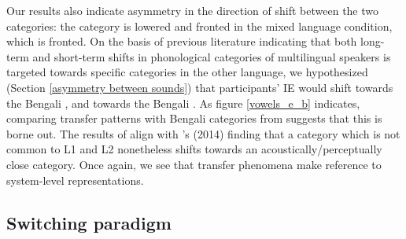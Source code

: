 \documentclass[12 pt]{article}
\newcommand{\nt}[1]{\textipa{[#1]}} %
\begin{document}
Our results also indicate asymmetry in the direction of shift between the two categories: the category \nt{2} is lowered and fronted in the mixed language condition, which \nt{\ae} is fronted. On the basis of previous literature indicating that both long-term and short-term shifts in phonological categories of multilingual speakers is targeted towards specific categories in the other language, we hypothesized (Section \ref{asymmetry between sounds}) that participants' IE \nt{\ae} would shift towards the Bengali \nt{\ae}, and \nt{2} towards the Bengali \nt{a:}. As figure \ref{vowels_e_b} indicates, comparing transfer patterns with Bengali categories from \cite{shruticorpus} suggests that this is borne out. The results of \nt{2} align with \citeauthor[][]{simonet2014phonetic}'s (2014) finding that a category which is not common to L1 and L2 nonetheless shifts towards an acoustically/perceptually close category. Once again, we see that transfer phenomena make reference to system-level representations. 


\subsection{Switching paradigm}
\end{document}
